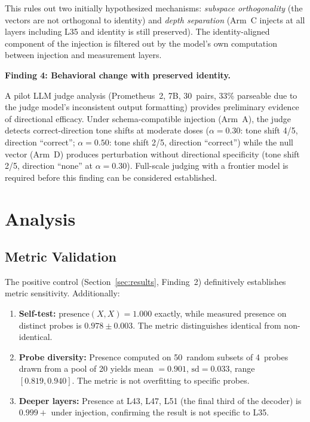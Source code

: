 \documentclass[11pt,a4paper]{article}
\begin{document}
This rules out two initially hypothesized mechanisms:
\emph{subspace orthogonality} (the vectors are not orthogonal to identity)
and \emph{depth separation} (Arm~C injects at all layers including L35 and
identity is still preserved). The identity-aligned component of the
injection is filtered out by the model's own computation between injection
and measurement layers.

\textbf{Finding 4: Behavioral change with preserved identity.}

A pilot LLM judge analysis (Prometheus~2, 7B, 30~pairs, 33\% parseable
due to the judge model's inconsistent output formatting) provides
preliminary evidence of directional efficacy. Under schema-compatible
injection (Arm~A), the judge detects correct-direction tone shifts at
moderate doses ($\alpha{=}0.30$: tone shift 4/5, direction ``correct'';
$\alpha{=}0.50$: tone shift 2/5, direction ``correct'') while the null
vector (Arm~D) produces perturbation without directional specificity
(tone shift 2/5, direction ``none'' at $\alpha{=}0.30$). Full-scale
judging with a frontier model is required before this finding can be
considered established.

\section{Analysis}
\label{sec:analysis}

\subsection{Metric Validation}

The positive control (Section~\ref{sec:results}, Finding~2) definitively
establishes metric sensitivity. Additionally:

\begin{enumerate}[nosep]
  \item \textbf{Self-test:} $\text{presence}(X, X) = 1.000$ exactly, while
    measured presence on distinct probes is $0.978 \pm 0.003$. The metric
    distinguishes identical from non-identical.
  \item \textbf{Probe diversity:} Presence computed on 50~random subsets of
    4~probes drawn from a pool of 20 yields mean $= 0.901$, $\text{sd}{=}0.033$,
    range $[0.819, 0.940]$. The metric is not overfitting to specific probes.
  \item \textbf{Deeper layers:} Presence at L43, L47, L51 (the final third
    of the decoder) is $0.999{+}$ under injection, confirming the result is
    not specific to L35.
\end{enumerate}
\end{document}
